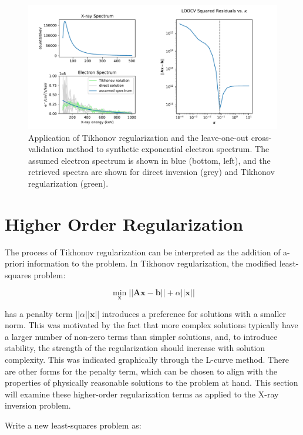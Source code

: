 \begin{figure}[p]
    \centering
    \includegraphics[width=1.1\textwidth]{figures/chapter_4/cross-validation-example/fig.pdf}
    \caption{Application of Tikhonov regularization and the leave-one-out cross-validation method to synthetic exponential electron spectrum. The assumed electron spectrum is shown in blue (bottom, left), and the retrieved spectra are shown for direct inversion (grey) and Tikhonov regularization (green).}
    \label{cross-validation-data}
\end{figure}
\newpage
\section{Higher Order Regularization}

The process of Tikhonov regularization can be interpreted as the addition of a-priori information to the problem. In Tikhonov regularization, the modified least-squares problem:

$$\min_{\mathbf{x}} \vert \vert \mathbf{A} \mathbf{x} - \mathbf{b} \vert \vert + \alpha \vert \vert \mathbf{x} \vert \vert$$

has a penalty term  $\vert \vert \alpha \vert \vert \mathbf{x} \vert \vert$ introduces a preference for solutions with a smaller norm. This was motivated by the fact that more complex solutions typically have a larger number of non-zero terms than simpler solutions, and, to introduce stability, the strength of the regularization should increase with solution complexity. This was indicated graphically through the L-curve method. There are other forms for the penalty term, which can be chosen to align with the properties of physically reasonable solutions to the problem at hand. This section will examine these higher-order regularization terms as applied to the X-ray inversion problem. 

Write a new least-squares problem as:

